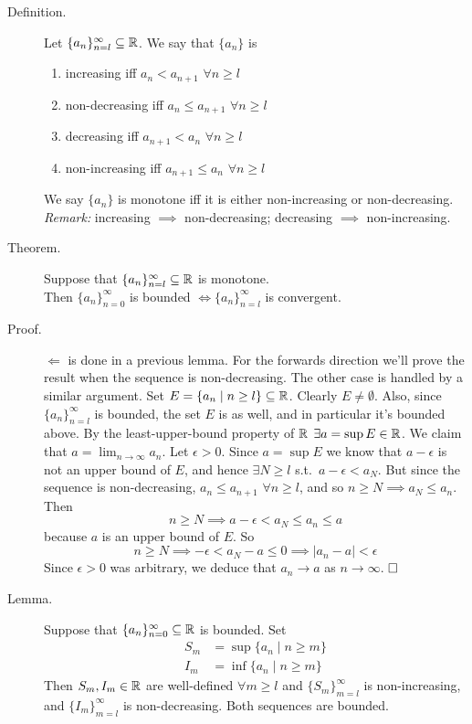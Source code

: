 \documentclass[letterpaper,11pt]{article}
\begin{document}
\begin{description}
\item[Definition.] Let $\{a_n\}_{n=l}^\infty\subseteq\mathbb{R}$. We say that
    $\{a_n\}$ is
    \begin{enumerate}[1)]
    \item increasing iff $a_n<a_{n+1}$ $\forall n\ge l$
    \item non-decreasing iff $a_n\le a_{n+1}$ $\forall n\ge l$
    \item decreasing iff $a_{n+1}<a_n$ $\forall n\ge l$
    \item non-increasing iff $a_{n+1}\le a_n$ $\forall n\ge l$
    \end{enumerate}
    We say $\{a_n\}$ is monotone iff it is either
    non-increasing or non-decreasing.\\
    \textit{Remark:} increasing $\implies$ non-decreasing;
        decreasing $\implies$ non-increasing.


\item[Theorem.] Suppose that $\{a_n\}_{n=l}^\infty\subseteq\mathbb{R}$ is monotone.\\
    Then $\{a_n\}_{n=0}^\infty$ is bounded
    $\iff\{a_n\}_{n=l}^\infty$ is convergent.

\item[Proof.] $\Leftarrow$ is done in a previous lemma. For the
    forwards direction we'll prove the result when the sequence is
    non-decreasing. The other case is handled by a similar argument.
    Set $E=\{a_n\;|\;n\ge l\}\subseteq\mathbb{R}$. Clearly $E\ne\emptyset$.
    Also, since $\{a_n\}_{n=l}^\infty$ is bounded, the set $E$
    is as well, and in particular it's bounded above. By the
    least-upper-bound property of $\mathbb{R}$ $\exists a=\sup E\in\mathbb{R}$.
    We claim that $a=\lim_{n\to\infty}a_n$. Let $\epsilon>0$.
    Since $a=\sup E$ we know that $a-\epsilon$ is not an upper bound
    of $E$, and hence $\exists N\ge l$ s.t.\ $a-\epsilon<a_N$.
    But since the sequence is non-decreasing, $a_n\le a_{n+1}$
    $\forall n\ge l$, and so $n\ge N\implies a_N\le a_n$.
    Then \[
    n\ge N\implies a-\epsilon<a_N\le a_n\le a
    \]
    because $a$ is an upper bound of $E$. So \[
    n\ge N\implies-\epsilon<a_N-a\le0\implies |a_n-a|<\epsilon
    \]
    Since $\epsilon>0$ was arbitrary, we deduce that
    $a_n\to a$ as $n\to\infty$. $\hfill\square$


\item[Lemma.] Suppose that $\{a_n\}_{n=0}^\infty\subseteq\mathbb{R}$ is bounded.
    Set \begin{align*}
    S_m&=\sup\{a_n\;|\;n\ge m\}\\
    I_m&=\inf\{a_n\;|\;n\ge m\}
    \end{align*}
    Then $S_m,I_m\in\mathbb{R}$ are well-defined $\forall m\ge l$ and
    $\{S_m\}_{m=l}^\infty$ is non-increasing, and
    $\{I_m\}_{m=l}^\infty$ is non-decreasing. Both sequences
    are bounded.


\end{description}
\end{document}
